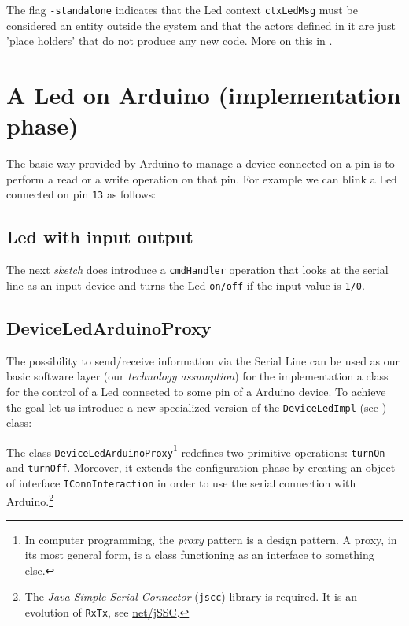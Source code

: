 The flag \texttt{-standalone}  indicates that the Led context \texttt{ctxLedMsg} must be considered an entity outside the system and that the actors defined in it are just 'place holders' that do not produce any new code. More on this in .

 
\newpage 
\section{A Led on Arduino (implementation phase)}
The basic way provided by Arduino to manage a device connected on a pin is to perform a read or a write operation on that pin. For example we can blink a Led connected on pin \texttt{13} as follows:

 

\subsection{Led with input output} 

The next \textit{sketch} does introduce a \texttt{cmdHandler} operation that looks at the serial line as an input device and turns the Led \texttt{on/off} if the input value is \texttt{1/0}.

 



\subsection{DeviceLedArduinoProxy} 
The possibility to send/receive information via the Serial Line can be used as our basic software layer (our \textit{technology assumption}) for the implementation a \java{} class for the control of a Led connected to some pin of a Arduino device. To achieve the goal let us introduce a new specialized version of the \texttt{DeviceLedImpl} (see ) class:




The class \texttt{DeviceLedArduinoProxy}\footnote{In computer programming, the \textit{proxy} pattern is a design pattern. A proxy, in its most general form, is a class functioning as an interface to something else.} redefines two primitive operations: \texttt{turnOn} and \texttt{turnOff}. 
%
Moreover, it extends the configuration phase by creating an object of interface \texttt{IConnInteraction} in order to use the serial connection with Arduino.\footnote{The \textit{Java Simple Serial Connector} (\texttt{jscc}) library  is required. It is an evolution of \texttt{RxTx}, see \href{https://blogs.oracle.com/jtc/entry/java_serial_communications_revisited}{net/jSSC}.} 

